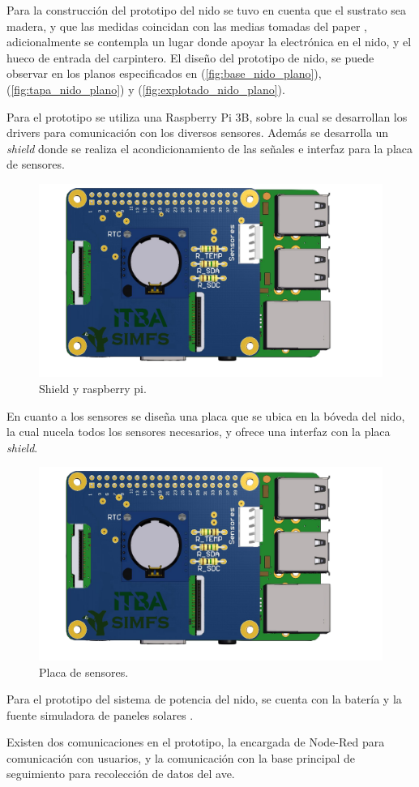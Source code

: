 Para la construcción del prototipo del nido se tuvo en cuenta que el sustrato sea madera, y que las medidas coincidan con las medias tomadas del paper \cite{ref:varepsilon_madera}, adicionalmente se contempla un lugar donde apoyar la electrónica en el nido, y el hueco de entrada del carpintero.
El diseño del prototipo de nido, se puede observar en los planos especificados en (\ref{fig:base_nido_plano}), (\ref{fig:tapa_nido_plano}) y (\ref{fig:explotado_nido_plano}).


Para el prototipo se utiliza una Raspberry Pi 3B, sobre la cual se desarrollan los drivers para comunicación con los diversos sensores. Además se desarrolla un \textit{shield}  donde se realiza el acondicionamiento de las señales e interfaz para la placa de sensores.

\begin{figure}[H]
	\centering
	\includegraphics[width=0.9\linewidth,page=1]{ImagenesConstruccion del prototipo/shieldSensor}		
	\caption{Shield  y raspberry pi.}
	\label{fig:shield}
\end{figure}

En cuanto a los sensores se diseña una placa que se ubica en la bóveda del nido, la cual nucela todos los sensores necesarios, y ofrece una interfaz con la placa \textit{shield}.
\begin{figure}[H]
	\centering
	\includegraphics[width=0.9\linewidth,page=2]{ImagenesConstruccion del prototipo/shieldSensor}		
	\caption{Placa de sensores.}
	\label{fig:sens}
\end{figure}
Para el prototipo del sistema de potencia del nido, se cuenta con la batería \TBC y la fuente simuladora de paneles solares \TBC.

Existen dos comunicaciones en el prototipo, la encargada de Node-Red para comunicación con usuarios, y la comunicación con la base principal de seguimiento para recolección de datos del ave.
